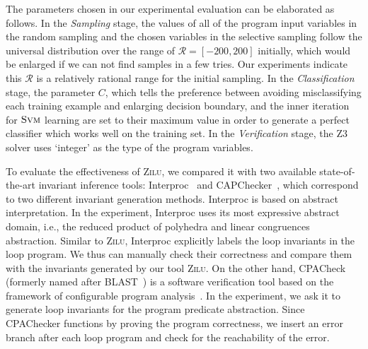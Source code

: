 The parameters chosen in our experimental evaluation can be elaborated as follows. 
In the \emph{Sampling} stage, 
the values of all of the program input variables in the random sampling 
and the chosen variables in the selective sampling 
follow the universal distribution over the range of $\mathcal{R} = [-200, 200]$ initially,
which would be enlarged if we can not find samples in a few tries.
Our experiments indicate this $\mathcal{R}$ is a relatively rational range for the initial sampling.
In the \emph{Classification} stage, 
the parameter $C$, 
which tells the preference between avoiding misclassifying each training example and enlarging decision boundary,
and the inner iteration 
for $\textsc{Svm}$ learning are set to their maximum value 
in order to generate a perfect classifier which works well on the training set. 
In the \emph{Verification} stage, 
the Z3 solver uses `integer' as the type of the program variables. 

To evaluate the effectiveness of \textsc{Zilu}, 
we compared it with two available state-of-the-art invariant inference tools: 
Interproc~\cite{cite} and CAPChecker~\cite{cite}, 
which correspond to two different invariant generation methods. 
Interproc is based on abstract interpretation. 
In the experiment, Interproc uses its most expressive abstract domain, i.e., 
the reduced product of polyhedra and linear congruences abstraction. 
Similar to \textsc{Zilu}, Interproc explicitly labels the loop invariants in the loop program. 
We thus can manually check their correctness
and compare them with the invariants generated by our tool \textsc{Zilu}. 
On the other hand, CPACheck (formerly named after BLAST~\cite{cite}) is a software verification tool 
based on the framework of configurable program analysis~\cite{cite}. 
In the experiment, we ask it to generate loop invariants for the program predicate abstraction. 
Since CPAChecker functions by proving the program correctness, 
we insert an error branch after each loop program and check for the reachability of the error. 

